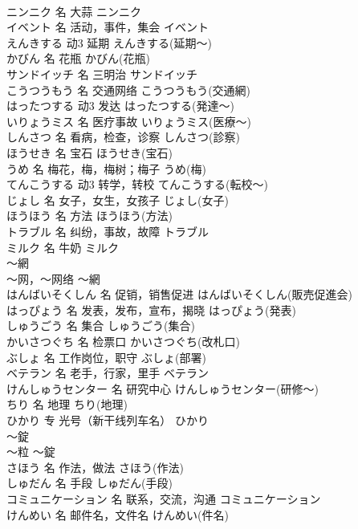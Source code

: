 \documentclass[8pt]{extreport}
\begin{document}
\begin{CJK}{UTF8}{min}
\\	ニンニク	名	大蒜	ニンニク	
\\	イベント	名	活动，事件，集会	イベント	
\\	えんきする	动3	延期	えんきする(延期～)	
\\	かびん	名	花瓶	かびん(花瓶)	
\\	サンドイッチ	名	三明治	サンドイッチ	
\\	こうつうもう	名	交通网络	こうつうもう(交通網)	
\\	はったつする	动3	发达	はったつする(発達～)	
\\	いりょうミス	名	医疗事故	いりょうミス(医療～)	
\\	しんさつ	名	看病，检查，诊察	しんさつ(診察)	
\\	ほうせき	名	宝石	ほうせき(宝石)	
\\	うめ	名	梅花，梅，梅树；梅子	うめ(梅)	
\\	てんこうする	动3	转学，转校	てんこうする(転校～)	
\\	じょし	名	女子，女生，女孩子	じょし(女子)	
\\	ほうほう	名	方法	ほうほう(方法)	
\\	トラブル	名	纠纷，事故，故障	トラブル	
\\	ミルク	名	牛奶	ミルク	
\\	～網	
\\	～网，～网络	～網	
\\	はんばいそくしん	名	促销，销售促进	はんばいそくしん(販売促進会)	
\\	はっぴょう	名	发表，发布，宣布，揭晓	はっぴょう(発表)	
\\	しゅうごう	名	集合	しゅうごう(集合)	
\\	かいさつぐち	名	检票口	かいさつぐち(改札口)	
\\	ぶしょ	名	工作岗位，职守	ぶしょ(部署)	
\\	ベテラン	名	老手，行家，里手	ベテラン	
\\	けんしゅうセンター	名	研究中心	けんしゅうセンター(研修～)	
\\	ちり	名	地理	ちり(地理)	
\\	ひかり	专	光号（新干线列车名）	ひかり	
\\	～錠	
\\	～粒	～錠	
\\	さほう	名	作法，做法	さほう(作法)	
\\	しゅだん	名	手段	しゅだん(手段)	
\\	コミュニケーション	名	联系，交流，沟通	コミュニケーション	
\\	けんめい	名	邮件名，文件名	けんめい(件名)	

\end{CJK}
\end{document}
